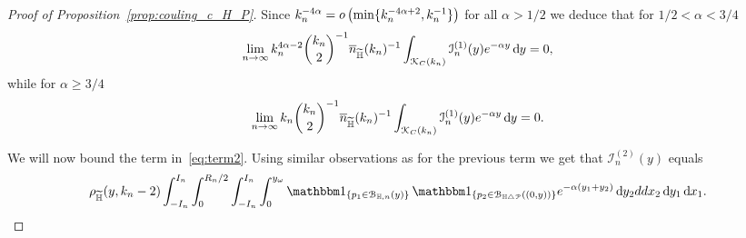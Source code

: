 \begin{proof}[Proof of Proposition~\ref{prop:couling_c_H_P}]
Since $k_n^{-4\alpha} = o\left(\min\{k_n^{-4\alpha + 2}, k_n^{-1}\}\right)$ for all $\alpha > 1/2$ we deduce that for $1/2 < \alpha < 3/4$
\[
	\lim_{n \to \infty} k_n^{4\alpha - 2} \binom{k_n}{2}^{-1} \overline{n}_{\widetilde{\mathbb{H}}}(k_n)^{-1} 
	\int_{{\mathcal K}_{C}(k_n)} \mathcal{I}_n^{(1)}(y) e^{-\alpha y} \operatorname{\mathrm{d}\hspace{-2pt}} y = 0,
\]
while for $\alpha \ge 3/4$
\[
	\lim_{n \to \infty} k_n \binom{k_n}{2}^{-1} \overline{n}_{\widetilde{\mathbb{H}}}(k_n)^{-1} 
		\int_{{\mathcal K}_{C}(k_n)} \mathcal{I}_n^{(1)}(y) e^{-\alpha y} \operatorname{\mathrm{d}\hspace{-2pt}} y = 0.
\]

We will now bound the term in~\eqref{eq:term2}. Using similar observations as for the previous term we get that $\mathcal{I}_n^{(2)}(y)$ equals
\[
	 \rho_{\HP}(y,k_n-2) \int_{-I_n}^{I_n} \int_0^{R_n/2}\int_{-I_n}^{I_n} \int_0^{y_\omega}
	 \ind{p_1 \in \BallHyp{y}} \, \ind{p_2 \in \BallSym{(0,y)}} e^{-\alpha(y_1 + y_2)} \dd y_2 
	 dd x_2 \dd y_1 \dd x_1.
\]


\end{proof}
